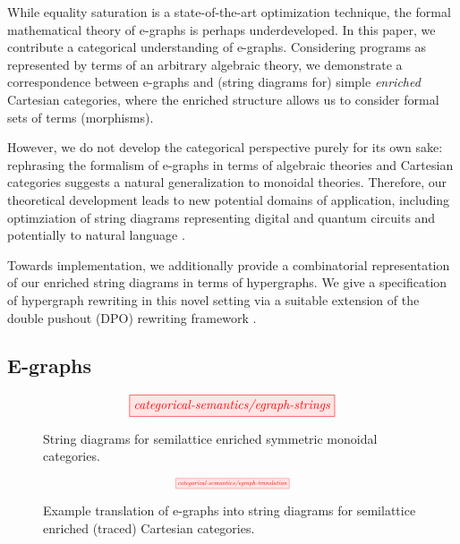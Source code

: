 While equality saturation is a state-of-the-art optimization technique, the formal mathematical theory of e-graphs is perhaps underdeveloped. In this paper, we contribute a categorical understanding of e-graphs. Considering programs as represented by terms of an arbitrary algebraic theory, we demonstrate a correspondence between e-graphs and (string diagrams for) simple \textit{enriched} Cartesian categories, where the enriched structure allows us to consider formal sets of terms (morphisms). 

However, we do not develop the categorical perspective purely for its own sake: rephrasing the formalism of e-graphs in terms of algebraic theories and Cartesian categories suggests a natural generalization to monoidal theories. Therefore, our theoretical development leads to new potential domains of application, including optimziation of string diagrams representing digital \cite{ghica_compositional_2023} and quantum circuits
\cite{coecke_interacting_2011,ZX} and potentially to natural language \cite{wazni_quantum_2022,coecke_lambek_2013}.

Towards implementation, we 
additionally provide a combinatorial representation of our enriched string diagrams in terms of hypergraphs. We give a specification of hypergraph rewriting in this novel setting via a suitable extension of the double pushout (DPO) rewriting framework 
\cite{bonchi_string_2022-1,bonchi_string_2022-2,bonchi_string_2022}.


\subsection*{E-graphs}

\begin{figure}\label{fig:egraph-strings}
\[
    \tikzfig{categorical-semantics/egraph-strings}
\]
\caption{String diagrams for semilattice enriched symmetric monoidal categories.}
\end{figure}

\begin{figure}\label{fig:e-graph-example}
\[
    \scalebox{0.5}{
    \tikzfig{categorical-semantics/egraph-translation}
    }
\]
\caption{Example translation of e-graphs into string diagrams for semilattice enriched (traced) Cartesian categories.}
\end{figure}

